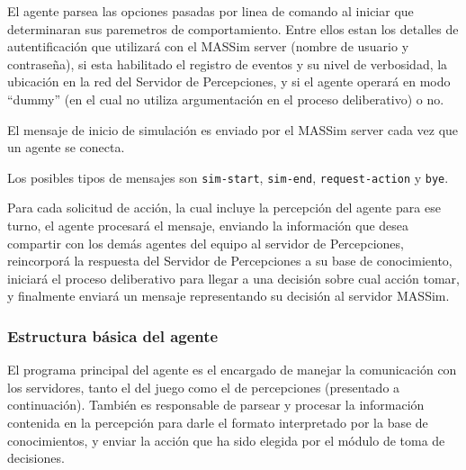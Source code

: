  El agente parsea las opciones pasadas por linea de comando al iniciar 
 que determinaran sus paremetros de comportamiento.
 Entre ellos estan los detalles de autentificación que utilizará con 
 el MASSim server (nombre de usuario y contraseña), si esta habilitado 
 el registro de eventos y su nivel de verbosidad, la ubicación en la 
 red del Servidor de Percepciones, y si el agente operará en modo 
 ``dummy'' (en el cual no utiliza argumentación en el proceso 
 deliberativo) o no. 

 El mensaje de inicio de simulación es enviado por el MASSim server 
 cada vez que un agente se conecta.  
 
 Los posibles tipos de mensajes son \texttt{sim-start}, \texttt{sim-end}, \texttt{request-action} y \texttt{bye}. 

 Para cada solicitud de acción, la cual incluye la percepción del 
 agente para ese turno, el agente procesará el mensaje, enviando la 
 información que desea compartir con los demás agentes del equipo al 
 servidor de Percepciones, reincorporá la respuesta del 
 Servidor de Percepciones a su base de conocimiento, iniciará el 
 proceso deliberativo para llegar a una decisión sobre cual acción 
 tomar, y finalmente enviará un mensaje representando su decisión al 
 servidor MASSim.   

\subsubsection{Estructura básica del agente}
 \label{subsub:estructura_basica_de_agente}
  
 El programa principal del agente es el encargado de manejar la
 comunicación con los servidores, tanto el del juego como el de
 percepciones (presentado a continuación).
 También es responsable de parsear y procesar la información contenida
 en la percepción para darle el formato interpretado por la base de
 conocimientos, y enviar la acción que ha sido elegida por el módulo
 de toma de decisiones.
 
